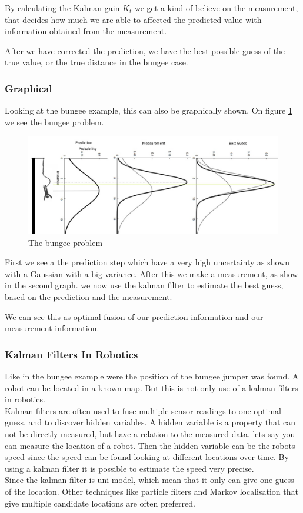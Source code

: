 By calculating the Kalman gain $K_t$ we get a kind of believe on the measurement, that decides how much we are able to affected the predicted value with information obtained from the measurement. 

After we have corrected the prediction, we have the best possible guess of the true value, or the true distance in the bungee case. 
\subsubsection{Graphical}
Looking at the bungee example, this can also be graphically shown. On figure \ref{bungeeFig} we see the bungee problem. 
\begin{figure}[H]
\centering
\includegraphics[width=1\textwidth]{billeder/Bungee.jpg}
\caption{The bungee problem}
\label{bungeeFig}
\end{figure}
First we see a the prediction step which have a very high uncertainty as shown with a Gaussian with a big variance. After this we make a measurement, as show in the second graph. we now use the kalman filter to estimate the best guess, based on the prediction and the measurement. 

We can see this as optimal fusion of our prediction information and our measurement information. 
\subsubsection{Kalman Filters In Robotics}
Like in the bungee example were the position of the bungee jumper was found. A robot can be located in a known map. 
But this is not only use of a kalman filters in robotics.\\
Kalman filters are often used to fuse multiple sensor readings to one optimal guess, and to discover hidden variables. A hidden variable is a property that can not be directly measured, but have a relation to the measured data. lets say you can measure the location of a robot. Then the hidden variable can be the robots speed since the speed can be found looking at different locations over time. By using a kalman filter it is possible to estimate the speed very precise. \\
Since the kalman filter is uni-model, which mean that it only can give one guess of the location. Other techniques like particle filters and Markov localisation that give multiple candidate locations are often preferred. 
